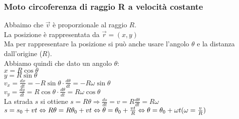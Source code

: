 \documentclass{article}
\begin{document}
\subsubsection*{Moto circoferenza di raggio R a velocit\`{a} costante}
Abbaimo che $\vec{v}$ \`{e} proporzionale al raggio $R$.\\
La posizione \`{e} rappresentata da $\vec{r}=(x,y)$\\
Ma per rappresentare la posizione si pu\`{o} anche usare l'angolo $\theta$ e la distanza
dall'origine ($R$).\\
Abbiamo quindi che dato un angolo $\theta$:\\
$x=R\cos\theta$\\
$y=R\sin\theta$\\
$v_x=\frac{dx}{dt}=-R\sin\theta\cdot\frac{d\theta}{dt}=-R\omega\sin\theta$\\
$v_y=\frac{dy}{dt}=R\cos\theta\cdot\frac{d\theta}{dt}=R\omega\cos\theta$\\
La strada $s$ si ottiene $s=R\theta\Rightarrow\frac{ds}{dt}=v=R\frac{d\theta}{dt}=R\omega$\\
$s=s_0+vt\Leftrightarrow R\theta=R\theta_0+vt\Leftrightarrow
\theta=\theta_0+\frac{vt}{R}\Leftrightarrow\theta=\theta_0+\omega t \\(\omega=\frac{v}{R})$
\end{document}
